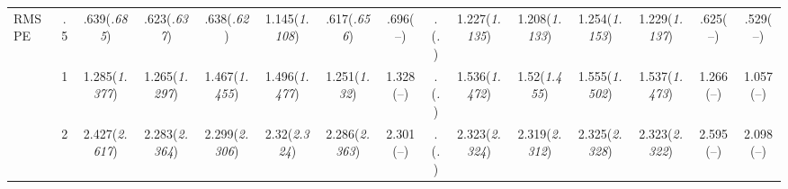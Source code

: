 \documentclass{article}
\begin{document}
\begin{table}[tbp]
{\begin{tabularx}{\textwidth}{lCCCCCCCCCCCCCC}
\midrule RMSPE&.5&.639\newline (\emph{.685})&.623\newline (\emph{.637})&.638\newline (\emph{.62})&1.145\newline (\emph{1.108})&.617\newline (\emph{.656})&.696\newline (--)&.\newline (\emph{.})&1.227\newline (\emph{1.135})&1.208\newline (\emph{1.133})&1.254\newline (\emph{1.153})&1.229\newline (\emph{1.137})&.625\newline (--)&.529\newline (--) \tabularnewline
&1&1.285\newline (\emph{1.377})&1.265\newline (\emph{1.297})&1.467\newline (\emph{1.455})&1.496\newline (\emph{1.477})&1.251\newline (\emph{1.32})&1.328\newline (--)&.\newline (\emph{.})&1.536\newline (\emph{1.472})&1.52\newline (\emph{1.455})&1.555\newline (\emph{1.502})&1.537\newline (\emph{1.473})&1.266\newline (--)&1.057\newline (--) \tabularnewline
&2&2.427\newline (\emph{2.617})&2.283\newline (\emph{2.364})&2.299\newline (\emph{2.306})&2.32\newline (\emph{2.324})&2.286\newline (\emph{2.363})&2.301\newline (--)&.\newline (\emph{.})&2.323\newline (\emph{2.324})&2.319\newline (\emph{2.312})&2.325\newline (\emph{2.328})&2.323\newline (\emph{2.322})&2.595\newline (--)&2.098\newline (--) \tabularnewline

\end{tabularx}}
\end{table}
\end{document}
